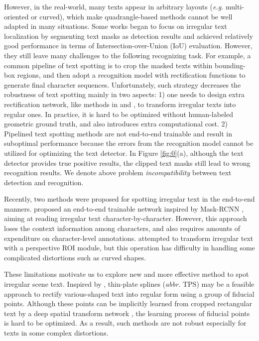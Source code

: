 \documentclass[letterpaper]{article} \usepackage{aaai20}  \usepackage{times}  \usepackage{helvet} \usepackage{courier}  \usepackage[hyphens]{url}  \usepackage{graphicx} \urlstyle{rm} \def\UrlFont{\rm}  \usepackage{graphicx}  \frenchspacing  \setlength{\pdfpagewidth}{8.5in}  \setlength{\pdfpageheight}{11in}  \usepackage{amsmath}
\begin{document}
However, in the real-world, many texts appear in arbitrary layouts (\emph{e.g.} multi-oriented or curved), which make quadrangle-based methods \cite{liao2017textboxes,zhou2017east,zhang2018feature} cannot be well adapted in many situations.
Some works \cite{dai2018fused,long2018textsnake,xie2018scene} began to focus on irregular text localization by segmenting text masks as detection results and achieved relatively good performance in terms of Intersection-over-Union (IoU) evaluation.
However, they still leave many challenges to the following recognizing task.
For example, a common pipeline of text spotting is to crop the masked texts within bounding-box regions, and then adopt a recognition model with rectification functions to generate final character sequences.
Unfortunately, such strategy decreases the robustness of text spotting mainly in two aspects:
1) one needs to design extra rectification network, like methods in \cite{luo2019moran} and \cite{zhan2019esir}, to transform irregular texts into regular ones.
In practice, it is hard to be optimized without human-labeled geometric ground truth, and also introduces extra computational cost.
2) Pipelined text spotting methods are not end-to-end trainable and result in suboptimal performance because the errors from the recognition model cannot be utilized for optimizing the text detector.
In Figure  \ref{fig:0}(a), although the text detector provides true positive results, the clipped text masks still lead to wrong recognition results.
We denote above problem \emph{incompatibility} between text detection and recognition.

Recently, two methods were proposed for spotting irregular text in the end-to-end manners.
\cite{lyu2018mask} proposed an end-to-end trainable network inspired by Mask-RCNN \cite{he2017mask}, aiming at reading irregular text character-by-character.
However, this approach loses the context information among characters, and also requires amounts of expenditure on character-level annotations.
\cite{sun2018textnet} attempted to transform irregular text with a perspective ROI module, but this operation has difficulty in handling some complicated distortions such as curved shapes.

These limitations motivate us to explore new and more effective method to spot irregular scene text.
Inspired by \cite{shi2016robust}, thin-plate splines (\emph{abbr.} TPS) \cite{bookstein1989principal} may be a feasible approach to rectify various-shaped text into regular form using a group of fiducial points. Although these points can be implicitly learned from cropped rectangular text by a deep spatial transform network \cite{jaderberg2015spatial}, the learning process of fiducial points is hard to be optimized. As a result, such methods are not robust especially for texts in some complex distortions.
\end{document}
